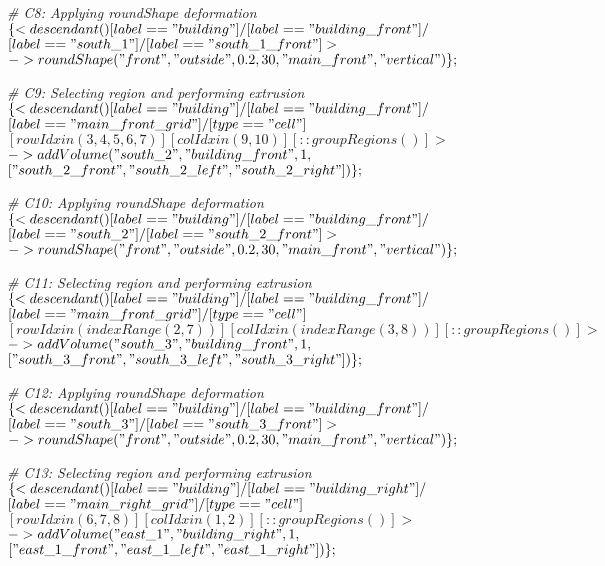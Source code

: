 \noindent \textit{\# C8: Applying roundShape deformation} \\
$\{< descendant() [label=="building"] / [label=="building\_front"] / $\\
$[label=="south\_1"] / [label=="south\_1\_front"] > $\\
$-> roundShape("front", "outside", 0.2, 30, "main\_front", "vertical")\};$

\noindent \textit{\# C9: Selecting region and performing extrusion} \\
$\{< descendant() [label=="building"] / [label=="building\_front"] / $\\
$[label=="main\_front\_grid"] / [type=="cell"] $\\
$[rowIdx in (3, 4, 5, 6, 7)] [colIdx in (9, 10)] [::groupRegions()] > $\\
$-> addVolume("south\_2", "building\_front", 1, $\\
$["south\_2\_front", "south\_2\_left", "south\_2\_right"])\};$

\noindent \textit{\# C10: Applying roundShape deformation} \\
$\{< descendant() [label=="building"] / [label=="building\_front"] / $\\
$[label=="south\_2"] / [label=="south\_2\_front"] > $\\
$-> roundShape("front", "outside", 0.2, 30, "main\_front", "vertical")\};$

\noindent \textit{\# C11: Selecting region and performing extrusion} \\
$\{< descendant() [label=="building"] / [label=="building\_front"] / $\\
$[label=="main\_front\_grid"] / [type=="cell"] $\\
$[rowIdx in (indexRange(2, 7))] [colIdx in (indexRange(3, 8))] [::groupRegions()] > $\\
$-> addVolume("south\_3", "building\_front", 1, $\\
$["south\_3\_front", "south\_3\_left", "south\_3\_right"])\};$

\noindent \textit{\# C12: Applying roundShape deformation} \\
$\{< descendant() [label=="building"] / [label=="building\_front"] / $\\
$[label=="south\_3"] / [label=="south\_3\_front"] > $\\
$-> roundShape("front", "outside", 0.2, 30, "main\_front", "vertical")\};$

\noindent \textit{\# C13: Selecting region and performing extrusion} \\
$\{< descendant() [label=="building"] / [label=="building\_right"] / $\\
$[label=="main\_right\_grid"] / [type=="cell"] $\\
$[rowIdx in (6, 7, 8)] [colIdx in (1, 2)] [::groupRegions()] > $\\
$-> addVolume("east\_1", "building\_right", 1, $\\
$["east\_1\_front", "east\_1\_left", "east\_1\_right"])\};$

